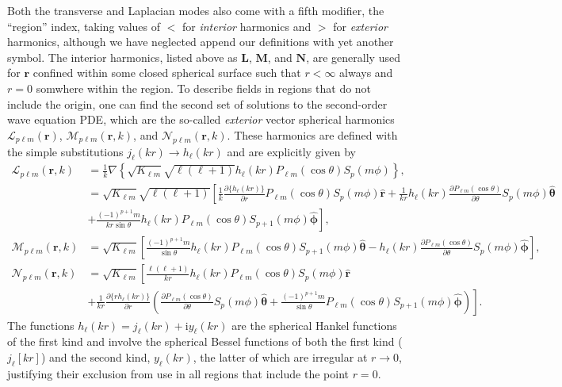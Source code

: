 Both the transverse and Laplacian modes also come with a fifth modifier, the ``region'' index, taking values of $<$ for \textit{interior} harmonics and $>$ for \textit{exterior} harmonics, although we have neglected append our definitions with yet another symbol. The interior harmonics, listed above as $\mathbf{L}$, $\mathbf{M}$, and $\mathbf{N}$, are generally used for $\mathbf{r}$ confined within some closed spherical surface such that $r<\infty$ always and $r = 0$ somwhere within the region. To describe fields in regions that do not include the origin, one can find the second set of solutions to the second-order wave equation PDE, which are the so-called \textit{exterior} vector spherical harmonics $\bm{\mathcal{L}}_{p\ell m}(\mathbf{r})$, $\bm{\mathcal{M}}_{p\ell m}(\mathbf{r},k)$, and $\bm{\mathcal{N}}_{p\ell m}(\mathbf{r},k)$. These harmonics are defined with the simple substitutions $j_\ell(kr)\to h_\ell(kr)$ and are explicitly given by
\begin{equation}
\begin{split}
\bm{\mathcal{L}}_{p\ell m}(\mathbf{r},k) &= \frac{1}{k}\nabla\left\{\sqrt{K_{\ell m}}\sqrt{\ell(\ell + 1)}h_\ell(kr)P_{\ell m}(\cos\theta)S_p(m\phi)\right\},\\
&= \sqrt{K_{\ell m}}\sqrt{\ell(\ell + 1)}\left[\frac{1}{k}\frac{\partial\{h_\ell(kr)\}}{\partial r}P_{\ell m}(\cos\theta)S_p(m\phi)\hat{\mathbf{r}} + \frac{1}{kr}h_\ell(kr)\frac{\partial P_{\ell m}(\cos\theta)}{\partial\theta}S_p(m\phi)\hat{\bm{\theta}}\right.\\
&\left. + \frac{(-1)^{p+1}m}{kr\sin\theta}h_\ell(kr)P_{\ell m}(\cos\theta)S_{p+1}(m\phi)\hat{\bm{\phi}}\right],\\[1.0em]
\bm{\mathcal{M}}_{p\ell m}(\mathbf{r},k) &= \sqrt{K_{\ell m}}\left[\frac{(-1)^{p + 1}m}{\sin\theta}h_\ell(kr)P_{\ell m}(\cos\theta)S_{p+1}(m\phi)\hat{\bm{\theta}} - h_\ell(kr)\frac{\partial P_{\ell m}(\cos\theta)}{\partial\theta}S_p(m\phi)\hat{\bm{\phi}}\right],\\[0.5em]
\bm{\mathcal{N}}_{p\ell m}(\mathbf{r},k) &= \sqrt{K_{\ell m}}\left[\frac{\ell(\ell + 1)}{kr}h_\ell(kr)P_{\ell m}(\cos\theta)S_p(m\phi)\hat{\mathbf{r}}\right.\\
&+ \left.\frac{1}{kr}\frac{\partial\{rh_\ell(kr)\}}{\partial r}\left(\frac{\partial P_{\ell m}(\cos\theta)}{\partial\theta}S_p(m\phi)\hat{\bm{\theta}} + \frac{(-1)^{p+1}m}{\sin\theta}P_{\ell m}(\cos\theta)S_{p + 1}(m\phi)\hat{\bm{\phi}}\right)\right].
\end{split}
\end{equation}
The functions $h_\ell(kr) = j_\ell(kr) + \mathrm{i}y_\ell(kr)$ are the spherical Hankel functions of the first kind and involve the spherical Bessel functions of both the first kind ($j_\ell[kr]$) and the second kind, $y_\ell(kr)$, the latter of which are irregular at $r\to0$, justifying their exclusion from use in all regions that include the point $r = 0$.

